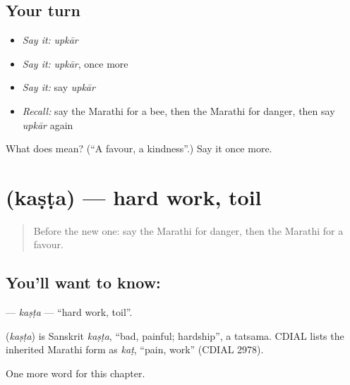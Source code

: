 \subsection*{Your turn}
\begin{itemize}
\raggedright
  \item \emph{Say it:} \emph{upkār}
  \item \emph{Say it:} \emph{upkār}, once more
  \item \emph{Say it:} say \emph{upkār}
  \item \emph{Recall:} say the Marathi for a bee, then the Marathi for danger, then say \emph{upkār} again
\end{itemize}

\begin{tcolorbox}[breakable,colback=teal!4,colframe=teal!35!black,title={Before you move on}]
What does  mean? (\textquotedblleft{}A favour, a kindness\textquotedblright{}.) Say it once more.
\end{tcolorbox}
\section[\texorpdfstring{\mr{कष्ट} (kaṣṭa)}{कष्ट (kaṣṭa)}]{ (kaṣṭa) — hard work, toil}

\label{lesson:MR-C189-kasta}



\begin{quote}
Before the new one: say the Marathi for danger, then the Marathi for a favour.
\end{quote}

\subsection*{You'll want to know: }
\textbf{} — \emph{kaṣṭa} — \textquotedblleft{}hard work, toil\textquotedblright{}.

\begin{cousinweb}
\textbf{} (\emph{kaṣṭa}) is Sanskrit \emph{kaṣṭa}, \textquotedblleft{}bad, painful; hardship\textquotedblright{}, a tatsama. CDIAL lists the inherited Marathi form as \emph{kaṭ}, \textquotedblleft{}pain, work\textquotedblright{} (CDIAL 2978).
\end{cousinweb}

\begin{grammarlens}[title={What you've built}]
One more word for this chapter.
\end{grammarlens}

